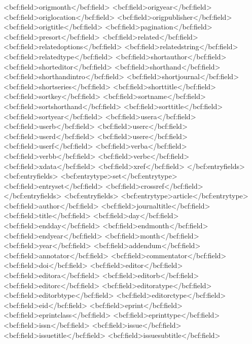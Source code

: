       <bcf:field>origmonth</bcf:field>
      <bcf:field>origyear</bcf:field>
      <bcf:field>origlocation</bcf:field>
      <bcf:field>origpublisher</bcf:field>
      <bcf:field>origtitle</bcf:field>
      <bcf:field>pagination</bcf:field>
      <bcf:field>presort</bcf:field>
      <bcf:field>related</bcf:field>
      <bcf:field>relatedoptions</bcf:field>
      <bcf:field>relatedstring</bcf:field>
      <bcf:field>relatedtype</bcf:field>
      <bcf:field>shortauthor</bcf:field>
      <bcf:field>shorteditor</bcf:field>
      <bcf:field>shorthand</bcf:field>
      <bcf:field>shorthandintro</bcf:field>
      <bcf:field>shortjournal</bcf:field>
      <bcf:field>shortseries</bcf:field>
      <bcf:field>shorttitle</bcf:field>
      <bcf:field>sortkey</bcf:field>
      <bcf:field>sortname</bcf:field>
      <bcf:field>sortshorthand</bcf:field>
      <bcf:field>sorttitle</bcf:field>
      <bcf:field>sortyear</bcf:field>
      <bcf:field>usera</bcf:field>
      <bcf:field>userb</bcf:field>
      <bcf:field>userc</bcf:field>
      <bcf:field>userd</bcf:field>
      <bcf:field>usere</bcf:field>
      <bcf:field>userf</bcf:field>
      <bcf:field>verba</bcf:field>
      <bcf:field>verbb</bcf:field>
      <bcf:field>verbc</bcf:field>
      <bcf:field>xdata</bcf:field>
      <bcf:field>xref</bcf:field>
    </bcf:entryfields>
    <bcf:entryfields>
      <bcf:entrytype>set</bcf:entrytype>
      <bcf:field>entryset</bcf:field>
      <bcf:field>crossref</bcf:field>
    </bcf:entryfields>
    <bcf:entryfields>
      <bcf:entrytype>article</bcf:entrytype>
      <bcf:field>author</bcf:field>
      <bcf:field>journaltitle</bcf:field>
      <bcf:field>title</bcf:field>
      <bcf:field>day</bcf:field>
      <bcf:field>endday</bcf:field>
      <bcf:field>endmonth</bcf:field>
      <bcf:field>endyear</bcf:field>
      <bcf:field>month</bcf:field>
      <bcf:field>year</bcf:field>
      <bcf:field>addendum</bcf:field>
      <bcf:field>annotator</bcf:field>
      <bcf:field>commentator</bcf:field>
      <bcf:field>doi</bcf:field>
      <bcf:field>editor</bcf:field>
      <bcf:field>editora</bcf:field>
      <bcf:field>editorb</bcf:field>
      <bcf:field>editorc</bcf:field>
      <bcf:field>editoratype</bcf:field>
      <bcf:field>editorbtype</bcf:field>
      <bcf:field>editorctype</bcf:field>
      <bcf:field>eid</bcf:field>
      <bcf:field>eprint</bcf:field>
      <bcf:field>eprintclass</bcf:field>
      <bcf:field>eprinttype</bcf:field>
      <bcf:field>issn</bcf:field>
      <bcf:field>issue</bcf:field>
      <bcf:field>issuetitle</bcf:field>
      <bcf:field>issuesubtitle</bcf:field>
